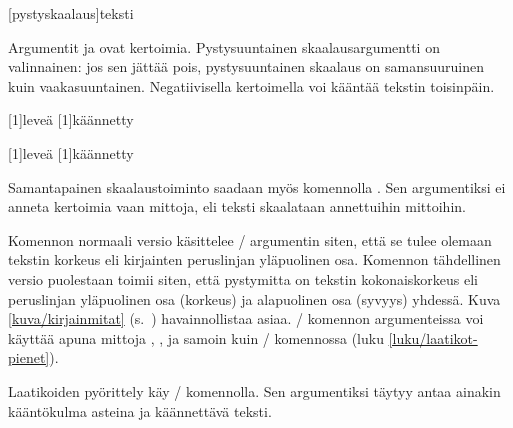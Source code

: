 \begin{koodilohkosis}
\scalebox{vaakaskaalaus}[pystyskaalaus]{teksti}
\end{koodilohkosis}

\noindent
Argumentit  ja  ovat
kertoimia. Pystysuuntainen skaalausargumentti on valinnainen: jos sen
jättää pois, pystysuuntainen skaalaus on samansuuruinen kuin
vaakasuuntainen. Negatiivisella kertoimella voi kääntää tekstin
toisinpäin.

\begin{koodilohkosis}
\scalebox{2}[1]{leveä} \scalebox{-1}[1]{käännetty}
\end{koodilohkosis}

\begin{tulossis}
  \scalebox{2}[1]{leveä} \scalebox{-1}[1]{käännetty}
\end{tulossis}

\noindent
Samantapainen skaalaustoiminto saadaan myös komennolla
. Sen argumentiksi ei anneta kertoimia vaan mittoja,
eli teksti skaalataan annettuihin mittoihin.

\begin{koodilohkosis}
\end{koodilohkosis}

\noindent
Komennon  normaali versio käsittelee
\-/ argumentin siten, että se tulee olemaan tekstin
korkeus eli kirjainten peruslinjan yläpuolinen osa. Komennon
 tähdellinen versio puolestaan toimii siten, että
pystymitta on tekstin kokonaiskorkeus eli peruslinjan yläpuolinen osa
(korkeus) ja alapuolinen osa (syvyys) yhdessä. Kuva
\ref{kuva/kirjainmitat} (s.~\pageref{kuva/kirjainmitat}) havainnollistaa
asiaa. \-/ komennon argumenteissa voi käyttää apuna
mittoja , ,  ja
 samoin kuin \-/ komennossa (luku
\ref{luku/laatikot-pienet}).

Laatikoiden pyörittely käy \-/ komennolla. Sen
argumentiksi täytyy antaa ainakin kääntökulma asteina ja käännettävä
teksti.

\begin{koodilohkosis}
\end{koodilohkosis}

